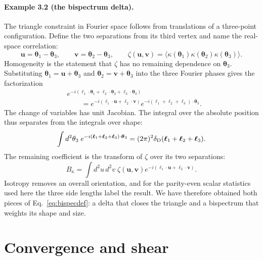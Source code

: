 \documentclass[11pt]{article}
\newcommand{\btheta}{\boldsymbol{\theta}}
\newcommand{\bell}{\boldsymbol{\ell}}
\numberwithin{equation}{section}
\begin{document}
\paragraph{Example 3.2 (the bispectrum delta).}
The triangle constraint in Fourier space follows from translations of a
three-point configuration. Define the two separations from its third
vertex and name the real-space correlation:
\begin{equation}
 \boldsymbol{u}=\btheta_1-\btheta_3,\qquad
 \boldsymbol{v}=\btheta_2-\btheta_3,\qquad
 \zeta(\boldsymbol{u},\boldsymbol{v})
 =\langle\kappa(\btheta_1)\kappa(\btheta_2)\kappa(\btheta_3)\rangle.
\end{equation}
Homogeneity is the statement that $\zeta$ has no remaining dependence
on $\btheta_3$. Substituting $\btheta_1=\boldsymbol{u}+\btheta_3$
and $\btheta_2=\boldsymbol{v}+\btheta_3$ into the three Fourier phases
gives the factorization
\begin{equation}
\begin{split}
 &e^{-i(\bell_1\cdot\btheta_1+\bell_2\cdot\btheta_2+
              \bell_3\cdot\btheta_3)}\\
 &\qquad=e^{-i(\bell_1\cdot\boldsymbol{u}+
                  \bell_2\cdot\boldsymbol{v})}
          e^{-i(\bell_1+\bell_2+\bell_3)\cdot\btheta_3}.
\end{split}
\end{equation}
The change of variables has unit Jacobian. The integral over the
absolute position thus separates from the integrals over shape:
\begin{equation}
 \int d^2\theta_3\;
 e^{-i(\bell_1+\bell_2+\bell_3)\cdot\btheta_3}
 =(2\pi)^2\delta_{\rm D}(\bell_1+\bell_2+\bell_3).
\end{equation}
The remaining coefficient is the transform of $\zeta$ over its two
separations:
\begin{equation}
 B_\kappa=
 \int d^2u\,d^2v\;\zeta(\boldsymbol{u},\boldsymbol{v})
 e^{-i(\bell_1\cdot\boldsymbol{u}+\bell_2\cdot\boldsymbol{v})}.
\end{equation}
Isotropy removes an overall orientation, and for the parity-even scalar
statistics used here the three side lengths label the result. We have
therefore obtained both pieces of Eq.~\eqref{eq:bispecdef}: a delta that
closes the triangle and a bispectrum that weights its shape and size.

\section{Convergence and shear}
\label{sec:lensing}
\end{document}
